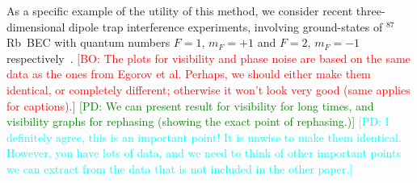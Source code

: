 \documentclass[aps,prl,twocolumn,showpacs,amsmath,amssymb,superscriptaddress]{revtex4-1}
\newcommand{\bogdansremark}[1]{\textcolor{red}{{[}BO: #1{]}}}
\newcommand{\petersremark}[1]{\textcolor{cyan}{{[}PD: #1{]}}}
\newcommand{\andreisremark}[1]{\textcolor{green}{{[}PD: #1{]}}}
\newcommand{\Rb}{$^{87}$Rb}
\begin{document}
As a specific example of the utility of this method,
we consider recent three-dimensional dipole trap interference experiments,
involving ground-states of \Rb~BEC with quantum numbers $F=1,\, m_{F}=+1$
and $F=2,\, m_{F}=-1$ respectively~\cite{Egorov2010}.
	\bogdansremark{The plots for visibility and phase noise are based on the same data
	as the ones from Egorov et al.
	Perhaps, we should either make them identical, or completely different;
	otherwise it won't look very good (same applies for captions).}
	\andreisremark{We can present result for visibility for long times,
	and visibility graphs for rephasing (showing the exact point of rephasing.)}
	\petersremark{I definitely agree, this is an important point!
	It is unwise to make them identical.
	However, you have lots of data, and we need to think of other important points
	we can extract from the data that is not included in the other paper.}
\end{document}

